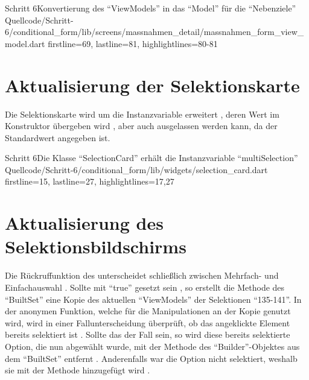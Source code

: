 \begin{alexlisting}{Schritt 6}{Konvertierung des \enquote{ViewModels} in das \enquote{Model} für die \enquote{Nebenziele}}
  {Quellcode/Schritt-6/conditional_form/lib/screens/massnahmen_detail/massnahmen_form_view_model.dart}
  {firstline=69, lastline=81, highlightlines={80-81}}
  \label{lst:Schritt6nebenzieleSetBuilder}
\end{alexlisting}

\section{Aktualisierung der Selektionskarte}

Die Selektionskarte wird um die Instanzvariable  erweitert ,
deren Wert im Konstruktor übergeben wird , aber auch ausgelassen werden kann, da der Standardwert  angegeben ist.

\begin{alexlisting}{Schritt 6}{Die Klasse \enquote{SelectionCard} erhält die Instanzvariable \enquote{multiSelection}}
  {Quellcode/Schritt-6/conditional_form/lib/widgets/selection_card.dart}
  {firstline=15, lastline=27, highlightlines={17,27}}
  \label{lst:Schritt6SelectionCard}
\end{alexlisting}

\section{Aktualisierung des Selektionsbildschirms}

Die Rückruffunktion  des  unterscheidet schließlich zwischen Mehrfach- und Einfachauswahl \Lst{\ref{lst:Schritt6CheckboxListTile}}.
Sollte  mit \enquote{true} gesetzt sein ,
so erstellt die Methode  des \enquote{BuiltSet} eine Kopie des aktuellen \enquote{ViewModels} der Selektionen \enquote{135-141}.
In der anonymen Funktion,
welche für die Manipulationen an der Kopie genutzt wird,
wird in einer Fallunterscheidung überprüft,
ob das angeklickte Element bereits selektiert ist .
Sollte das der Fall sein,
so wird diese bereits selektierte Option, die nun abgewählt wurde,
mit der Methode  des \enquote{Builder}-Objektes aus dem \enquote{BuiltSet} entfernt .
Anderenfalls war die Option nicht selektiert, weshalb sie mit der Methode  hinzugefügt wird . 


